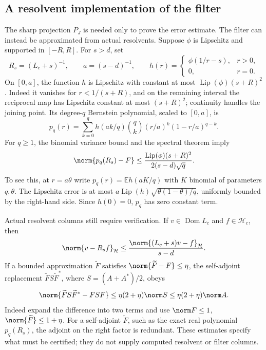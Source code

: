 \documentclass[11pt,a4paper]{article}
\numberwithin{equation}{section}
\theoremstyle{definition}\newtheorem{definition}[theorem]{Definition}
\theoremstyle{remark}\newtheorem{remark}[theorem]{Remark}
\newcommand{\Hh}{\mathcal H}\newcommand{\Hw}{\mathcal H}
\newcommand{\dom}{\operatorname{Dom}}\newcommand{\Var}{\operatorname{Var}}
\begin{document}
\subsection{A resolvent implementation of the filter}
\label{vfourB:resolvent-filter}

The sharp projection $P_J$ is needed only to prove the error estimate.
The filter can instead be approximated from actual resolvents. Suppose
$\phi$ is Lipschitz and supported in $[-R,R]$. For $s>d$, set
\[
 R_s=(L_c+s)^{-1},\qquad a=(s-d)^{-1},\qquad
 h(r)=\begin{cases}\phi(1/r-s),&r>0,\\0,&r=0.\end{cases}
\]
On $[0,a]$, the function $h$ is Lipschitz with constant at most
$\operatorname{Lip}(\phi)(s+R)^2$. Indeed it vanishes for
$r<1/(s+R)$, and on the remaining interval the reciprocal map has
Lipschitz constant at most $(s+R)^2$; continuity handles the joining
point. Its degree-$q$ Bernstein polynomial, scaled to $[0,a]$, is
\[
 p_q(r)=\sum_{k=0}^q h(ak/q)\binom qk(r/a)^k(1-r/a)^{q-k}.
\]
For $q\ge1$, the binomial variance bound and the spectral theorem imply
\begin{equation}\label{vfourB:bernstein-error}
 \norm{p_q(R_s)-F}
 \le\frac{\operatorname{Lip}(\phi)(s+R)^2}
                 {2(s-d)\sqrt q}.
\end{equation}
To see this, at $r=a\theta$ write $p_q(r)=\mathbb E h(aK/q)$ with
$K$ binomial of parameters $q,\theta$. The Lipschitz error is at most
$a\operatorname{Lip}(h)\sqrt{\theta(1-\theta)/q}$, uniformly bounded
by the right-hand side. Since $h(0)=0$, $p_q$ has zero constant term.

Actual resolvent columns still require verification. If
$v\in\dom L_c$ and $f\in\Hh_c$, then
\begin{equation}\label{vfourB:resolvent-residual}
 \norm{v-R_sf}_{\Hh}
 \le\frac{\norm{(L_c+s)v-f}_{\Hh}}{s-d}.
\end{equation}
If a bounded approximation $\widetilde F$ satisfies
$\norm{\widetilde F-F}\le\eta$, the self-adjoint replacement
$\widetilde F S\widetilde F^*$, where $S=(A+A^*)/2$, obeys
\begin{equation}\label{vfourB:filter-replacement}
 \norm{\widetilde F S\widetilde F^*-FSF}
 \le\eta(2+\eta)\norm S
 \le\eta(2+\eta)\norm A.
\end{equation}
Indeed expand the difference into two terms and use
$\norm F\le1$, $\norm{\widetilde F}\le1+\eta$.
For a self-adjoint $\widetilde F$, such as the exact real polynomial
$p_q(R_s)$, the adjoint on the right factor is redundant. These estimates
specify what must be certified; they do not supply computed resolvent or
filter columns.
\end{document}
